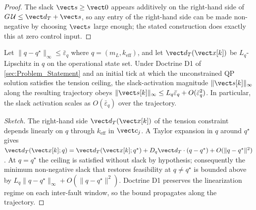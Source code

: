 \begin{proof}
The slack $\vect s \ge \vect 0$ appears additively on the right-hand side of $G\,\mathcal{U} \le \vect d_T + \vect s$, so any entry of the right-hand side can be made non-negative by choosing $\vect s$ large enough; the stated construction does exactly this at zero control input.
\end{proof}

\begin{proposition}
\label{prop:mpc-slack}
Let $\|q - q^\star\|_\infty \le \bar\varepsilon_q$ where $q = (m_L, k_{\mathrm{eff}})$, and let $\vect d_T(\vect x[k])$ be $L_q$-Lipschitz in $q$ on the operational state set. Under Doctrine D1 of \cref{sec:Problem_Statement} and an initial tick at which the unconstrained QP solution satisfies the tension ceiling, the slack-activation magnitude $\|\vect s[k]\|_\infty$ along the resulting trajectory obeys $\|\vect s[k]\|_\infty \le L_q \bar\varepsilon_q + O(\bar\varepsilon_q^2)$. In particular, the slack activation scales as $O(\bar\varepsilon_q)$ over the trajectory.
\end{proposition}

\begin{proof}[Sketch]
The right-hand side $\vect d_T(\vect x[k])$ of the tension constraint depends linearly on $q$ through $k_{\mathrm{eff}}$ in $\vect c_j$. A Taylor expansion in $q$ around $q^\star$ gives $\vect d_T(\vect x[k]; q) = \vect d_T(\vect x[k]; q^\star) + D_q \vect d_T \cdot (q - q^\star) + O(\|q - q^\star\|^2)$. At $q = q^\star$ the ceiling is satisfied without slack by hypothesis; consequently the minimum non-negative slack that restores feasibility at $q \ne q^\star$ is bounded above by $L_q \|q - q^\star\|_\infty + O(\|q - q^\star\|^2)$. Doctrine D1 preserves the linearization regime on each inter-fault window, so the bound propagates along the trajectory.
\end{proof}

